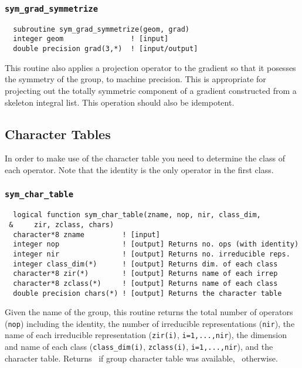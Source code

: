 \subsubsection{{\tt sym\_grad\_symmetrize}}
\begin{verbatim}
  subroutine sym_grad_symmetrize(geom, grad)
  integer geom                ! [input]
  double precision grad(3,*)  ! [input/output]
\end{verbatim}

This routine also applies a projection operator
 to the gradient so that it posesses the
symmetry of the group, to machine precision.  This is appropriate for
projecting out the totally symmetric component of a gradient
constructed from a skeleton integral list.  This operation should also be
idempotent. 

\subsection{Character Tables}

In order to make use of the character table you need to determine the
class of each operator.  Note that the identity is the only operator
in the first class.

\subsubsection{{\tt sym\_char\_table}}
\begin{verbatim}
  logical function sym_char_table(zname, nop, nir, class_dim,
 &     zir, zclass, chars)
  character*8 zname         ! [input]
  integer nop               ! [output] Returns no. ops (with identity)
  integer nir               ! [output] Returns no. irreducible reps.
  integer class_dim(*)      ! [output] Returns dim. of each class
  character*8 zir(*)        ! [output] Returns name of each irrep
  character*8 zclass(*)     ! [output] Returns name of each class
  double precision chars(*) ! [output] Returns the character table
\end{verbatim}
Given the name of the group, this routine returns the
total number of operators (\verb+nop+) including the identity, the
number of irreducible representations (\verb+nir+), the name of each
irreducible representation (\verb+zir(i)+, \verb+i=1,...,nir+), the
dimension and name of each class (\verb+class_dim(i)+,
\verb+zclass(i)+, \verb+i=1,...,nir+), and the character table.  
Returns \TRUE\ if group character table was available, \FALSE\ 
otherwise.

